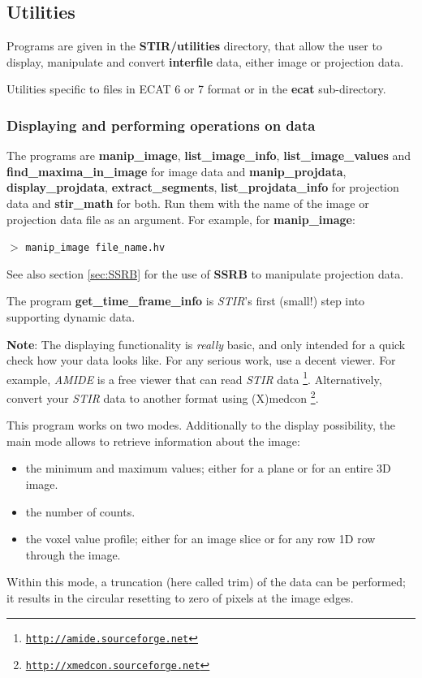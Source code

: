 \documentclass{article}
\def\R2Lurl#1#2{\mbox{\href{#1}{\tt #2}}}
\newcommand{\cmdline}[1]{\par \noindent $>$ \texttt{#1}\par}
\begin{document}
\subsection{
Utilities}

Programs are given in the \textbf{STIR/utilities} directory, that 
allow the user to display, manipulate and convert \textbf{interfile} 
data, either image or projection data.

Utilities specific to files in ECAT 6 or 7 format or in the \textbf{ecat}
sub-directory.

\subsubsection{
Displaying and performing operations on data}

The programs are \textbf{manip\_image}, \textbf{list\_image\_info}, 
\textbf{list\_image\_values} and \textbf{find\_maxima\_in\_image}
for image data and \textbf{manip\_projdata}, 
 \textbf{display\_projdata}, \textbf{extract\_segments}, 
\textbf{list\_projdata\_info} for 
projection data and \textbf{stir\_math} for both. Run them with the 
name of the image or projection data file as an argument. For 
example, for \textbf{manip\_image}:
\cmdline{manip\_image file\_name.hv}


See also section \ref{sec:SSRB} for the use of \textbf{SSRB} to manipulate projection 
data.


The program \textbf{get\_time\_frame\_info} is \textit{STIR}'s first (small!) 
step into supporting dynamic data.


\textbf{Note}: The displaying functionality is \textit{really} basic, and 
only intended for a quick check how your data looks like. For 
any serious work, use a decent viewer. For example, \textit{AMIDE} 
is a free viewer that can read \textit{STIR} data
\footnote{\R2Lurl{http://amide.sourceforge.net }{http://amide.sourceforge.net}}. Alternatively, 
convert your \textit{STIR} data to another format using (X)medcon
\footnote{\R2Lurl{http://xmedcon.sourceforge.net }{http://xmedcon.sourceforge.net}}.

{ 
}

This program works on two modes. Additionally to the display 
possibility, the main mode allows to retrieve information about 
the image:

\begin{itemize}
\item the minimum and maximum values; either for a plane or for an 
entire 3D image.
\item the number of counts.
\item the voxel value profile; either for an image slice or for any 
row 1D row through the image.
\end{itemize}
Within this mode, a truncation (here called trim) of the data 
can be performed; it results in the circular resetting to zero 
of pixels at the image edges.
\end{document}
